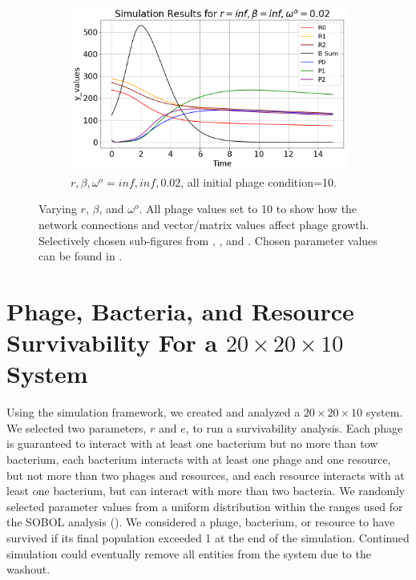 \begin{figure}[]
\begin{subfigure}{0.32\linewidth}
        \includegraphics[width=\linewidth]{Images/Plots/Created/UA/r_beta_washout_inf_inf_0.02.png}
        \caption{
            $r, \beta, \omega^o = inf, inf, 0.02$, all initial phage condition=10. 
        }
        \label{fig:created:r_beta_washout_inf_inf_0.02}
    \end{subfigure}
    \caption{
        Varying $r$, $\beta$, and $\omega^o$. 
        All phage values set to 10 to show how the network connections and vector/matrix values affect phage growth. 
        Selectively chosen sub-figures from , , and . 
        Chosen parameter values can be found in . 
    }
\end{figure}

\section{Phage, Bacteria, and Resource Survivability For a $20\times20\times10$ System}


Using the simulation framework, we created and analyzed a $20\times20\times10$ system. 
We selected two parameters, $r$ and $e$, to run a survivability analysis. 
Each phage is guaranteed to interact with at least one bacterium but no more than tow bacterium, each bacterium interacts with at least one phage and one resource, but not more than two phages and resources, and each resource interacts with at least one bacterium, but can interact with more than two bacteria. 
We randomly selected parameter values from a uniform distribution within the ranges used for the SOBOL analysis (). 
We considered a phage, bacterium, or resource to have survived if its final population exceeded 1 at the end of the simulation. 
Continued simulation could eventually remove all entities from the system due to the washout. 

